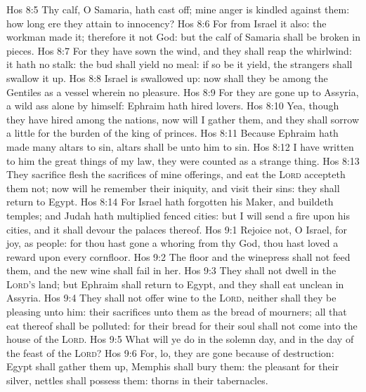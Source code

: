 \vs Hos 8:5 Thy calf, O Samaria, hath cast  off; mine anger is kindled against them: how long  ere they attain to innocency?
\vs Hos 8:6 For from Israel  it also: the workman made it; therefore it  not God: but the calf of Samaria shall be broken in pieces.
\vs Hos 8:7 For they have sown the wind, and they shall reap the whirlwind: it hath no stalk: the bud shall yield no meal: if so be it yield, the strangers shall swallow it up.
\vs Hos 8:8 Israel is swallowed up: now shall they be among the Gentiles as a vessel wherein  no pleasure.
\vs Hos 8:9 For they are gone up to Assyria, a wild ass alone by himself: Ephraim hath hired lovers.
\vs Hos 8:10 Yea, though they have hired among the nations, now will I gather them, and they shall sorrow a little for the burden of the king of princes.
\vs Hos 8:11 Because Ephraim hath made many altars to sin, altars shall be unto him to sin.
\vs Hos 8:12 I have written to him the great things of my law,  they were counted as a strange thing.
\vs Hos 8:13 They sacrifice flesh  the sacrifices of mine offerings, and eat  the \textsc{Lord} accepteth them not; now will he remember their iniquity, and visit their sins: they shall return to Egypt.
\vs Hos 8:14 For Israel hath forgotten his Maker, and buildeth temples; and Judah hath multiplied fenced cities: but I will send a fire upon his cities, and it shall devour the palaces thereof.
\vs Hos 9:1 Rejoice not, O Israel, for joy, as  people: for thou hast gone a whoring from thy God, thou hast loved a reward upon every cornfloor.
\vs Hos 9:2 The floor and the winepress shall not feed them, and the new wine shall fail in her.
\vs Hos 9:3 They shall not dwell in the \textsc{Lord's} land; but Ephraim shall return to Egypt, and they shall eat unclean  in Assyria.
\vs Hos 9:4 They shall not offer wine  to the \textsc{Lord}, neither shall they be pleasing unto him: their sacrifices  unto them as the bread of mourners; all that eat thereof shall be polluted: for their bread for their soul shall not come into the house of the \textsc{Lord}.
\vs Hos 9:5 What will ye do in the solemn day, and in the day of the feast of the \textsc{Lord}?
\vs Hos 9:6 For, lo, they are gone because of destruction: Egypt shall gather them up, Memphis shall bury them: the pleasant  for their silver, nettles shall possess them: thorns  in their tabernacles.
